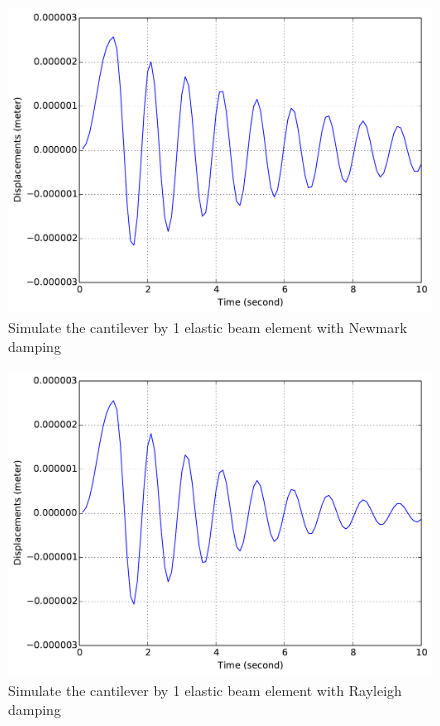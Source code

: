 \begin{figure}[!htb]
  \centering
  \includegraphics[width=12cm]{./Figure-files/_Chapter_Appendix_Illustrative_Examples/beam-1element-Newmark-damping.pdf}
  \caption{Simulate the cantilever by 1 elastic beam element with Newmark damping}
  \label{fig_1beam_newmark}
\end{figure}

\begin{figure}[!htb]
  \centering
  \includegraphics[width=12cm]{./Figure-files/_Chapter_Appendix_Illustrative_Examples/beam-1element-Rayleigh-damping.pdf}
  \caption{Simulate the cantilever by 1 elastic beam element with Rayleigh damping}
  \label{fig_1beam_rayleigh}
\end{figure}




